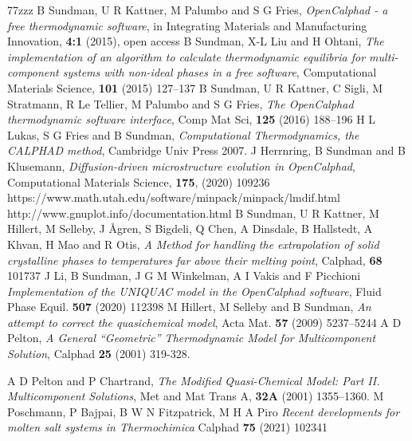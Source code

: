\documentclass[11pt]{article}
\begin{document}
\begin{thebibliography}{77zzz}
 B Sundman, U R Kattner, M Palumbo and S G
  Fries, {\em OpenCalphad - a free thermodynamic software}, in
  Integrating Materials and Manufacturing Innovation, {\bf 4:1}
  (2015), open access
 B Sundman, X-L Liu and H Ohtani, {\em The
  implementation of an algorithm to calculate thermodynamic equilibria
  for multi-component systems with non-ideal phases in a free
  software}, Computational Materials Science, {\bf 101} (2015) 127--137
 B Sundman, U R Kattner, C Sigli, M Stratmann, R
  Le Tellier, M Palumbo and S G Fries, {\em The OpenCalphad
    thermodynamic software interface}, Comp Mat Sci, {\bf 125} (2016)
  188--196
 H L Lukas, S G Fries and B Sundman, {\em
  Computational Thermodynamics, the CALPHAD method}, Cambridge Univ
  Press 2007.
 J Herrnring, B Sundman and B Klusemann, {\em
  Diffusion-driven microstructure evolution in OpenCalphad},
  Computational Materials Science, {\bf 175}, (2020) 109236
  https://www.math.utah.edu/software/minpack/minpack/lmdif.html
 http://www.gnuplot.info/documentation.html
 B Sundman, U R Kattner, M Hillert, M Selleby, J
  {\AA}gren, S Bigdeli, Q Chen, A Dinsdale, B Hallstedt, A Khvan, H
  Mao and R Otis, {\em A Method for handling the extrapolation of
    solid crystalline phases to temperatures far above their melting
    point}, Calphad, {\bf 68} 101737
 J Li, B Sundman, J G M Winkelman, A I Vakis and F Picchioni
  {\em Implementation of the UNIQUAC model in the OpenCalphad software},
  Fluid Phase Equil. {\bf 507} (2020) 112398
 M Hillert, M Selleby and B Sundman, {\em An attempt to
  correct the quasichemical model}, Acta Mat. {\bf 57} (2009) 5237--5244
 A D Pelton, {\em A General ``Geometric'' Thermodynamic
  Model for Multicomponent Solution}, Calphad {\bf 25} (2001) 319-328.

 A D Pelton and P Chartrand, {\em The Modified Quasi-Chemical
  Model: Part II. Multicomponent Solutions}, Met and Mat Trans A, {\bf 32A}
  (2001) 1355--1360.
 M Poschmann, P Bajpai, B W N Fitzpatrick, M H A Piro
  {\em Recent developments for molten salt systems in Thermochimica}
  Calphad {\bf 75} (2021) 102341
\end{thebibliography}
\end{document}
